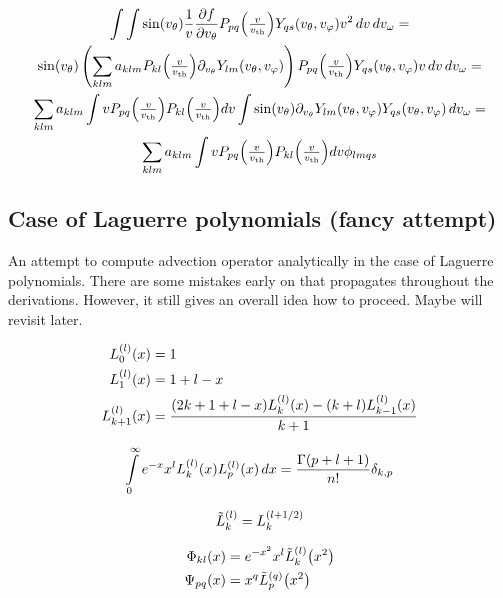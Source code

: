 \documentclass{article}[draft]
\begin{document}
\begin{multline*}
\myint \myint \sin\of{\vtheta} \frac{1}{\vr} \frac{\partial f}{\partial \vtheta} P_{pq}\of{\textstyle\frac{\vr}{\vth}} Y_{qs}\of{\vtheta,\vphi} \vr^2 \diff{\vr} \diff{\vomega} = \\
\sin\of{\vtheta}\left(\sum_{klm} a_{klm} P_{kl}\of{\textstyle\frac{v}{\vth}} \partial_{v_\theta} Y_{lm}\of{\vtheta,\vphi} \right) P_{pq}\of{\textstyle\frac{\vr}{\vth}} Y_{qs}\of{\vtheta,\vphi} \vr \diff{\vr} \diff{\vomega} = \\
\sum_{klm} a_{klm} \myint v P_{pq}\of{\textstyle\frac{v}{\vth}} P_{kl}\of{\textstyle\frac{v}{\vth}} dv \myint \sin\of{\vtheta} \partial_{v_\theta} Y_{lm}\of{\vtheta,\vphi}  Y_{qs}\of{\vtheta,\vphi} \diff{v_{\omega}} = \\
\sum_{klm} a_{klm} \myint v P_{pq}\of{\textstyle\frac{v}{\vth}} P_{kl}\of{\textstyle\frac{v}{\vth}} dv \phi_{lmqs}
\end{multline*}


\subsection{Case of Laguerre polynomials (fancy attempt)}
An attempt to compute advection operator analytically in the case of Laguerre polynomials. There are some mistakes early on that propagates throughout the derivations. However, it still gives an overall idea how to proceed. Maybe will revisit later.

\begin{align*}
\lp{l}{0}\of{x} &= 1 \\
\lp{l}{1}\of{x} &= 1 + l - x \\
\lp{l}{k+1}\of{x} &= \frac{(2k+1+l-x) \lp{l}{k}\of{x} - (k+l) \lp{l}{k-1}\of{x}}{k+1}
\end{align*}

\begin{align*}
\myint_0^\infty e^{-x} x^l \lp{l}{k}\of{x} \lp{l}{p}\of{x} \diff{x} = \frac{\Gamma\of{p + l + 1}}{n!} \delta_{k,p}
\end{align*}

\begin{align*}
\tilde{L}^{(l)}_{k} = L^{(l+1/2)}_{k}
\end{align*}

\begin{align*}
\Phi_{kl}\of{x} &= e^{-x^2} x^l \lph{l}{k}\of{x^2} \\
\Psi_{pq}\of{x} &= x^q \lph{q}{p}\of{x^2} 
\end{align*}
\end{document}
